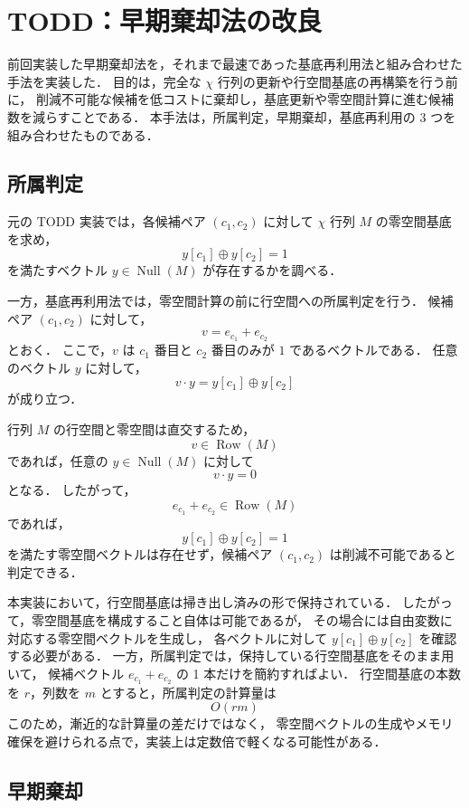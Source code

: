 \section{TODD：早期棄却法の改良}

前回実装した早期棄却法を，それまで最速であった基底再利用法と組み合わせた手法を実装した．
目的は，完全な $\chi$ 行列の更新や行空間基底の再構築を行う前に，
削減不可能な候補を低コストに棄却し，基底更新や零空間計算に進む候補数を減らすことである．
本手法は，所属判定，早期棄却，基底再利用の 3 つを組み合わせたものである．

\subsection{所属判定}

元の TODD 実装では，各候補ペア $(c_1,c_2)$ に対して
$\chi$ 行列 $M$ の零空間基底を求め，
\[
    y[c_1] \oplus y[c_2] = 1
\]
を満たすベクトル $y \in \operatorname{Null}(M)$ が存在するかを調べる．

一方，基底再利用法では，零空間計算の前に行空間への所属判定を行う．
候補ペア $(c_1,c_2)$ に対して，
\[
    v = e_{c_1}+e_{c_2}
\]
とおく．
ここで，$v$ は $c_1$ 番目と $c_2$ 番目のみが $1$ であるベクトルである．
任意のベクトル $y$ に対して，
\[
    v \cdot y = y[c_1] \oplus y[c_2]
\]
が成り立つ．

行列 $M$ の行空間と零空間は直交するため，
\[
    v \in \operatorname{Row}(M)
\]
であれば，任意の $y \in \operatorname{Null}(M)$ に対して
\[
    v \cdot y = 0
\]
となる．
したがって，
\[
    e_{c_1}+e_{c_2} \in \operatorname{Row}(M)
\]
であれば，
\[
    y[c_1] \oplus y[c_2] = 1
\]
を満たす零空間ベクトルは存在せず，候補ペア $(c_1,c_2)$ は削減不可能であると判定できる．

本実装において，行空間基底は掃き出し済みの形で保持されている．
したがって，零空間基底を構成すること自体は可能であるが，
その場合には自由変数に対応する零空間ベクトルを生成し，
各ベクトルに対して $y[c_1]\oplus y[c_2]$ を確認する必要がある．
一方，所属判定では，保持している行空間基底をそのまま用いて，
候補ベクトル $e_{c_1}+e_{c_2}$ の 1 本だけを簡約すればよい．
行空間基底の本数を $r$，列数を $m$ とすると，所属判定の計算量は
\[
    O(rm)
\]
このため，漸近的な計算量の差だけではなく，
零空間ベクトルの生成やメモリ確保を避けられる点で，実装上は定数倍で軽くなる可能性がある．

\subsection{早期棄却}

